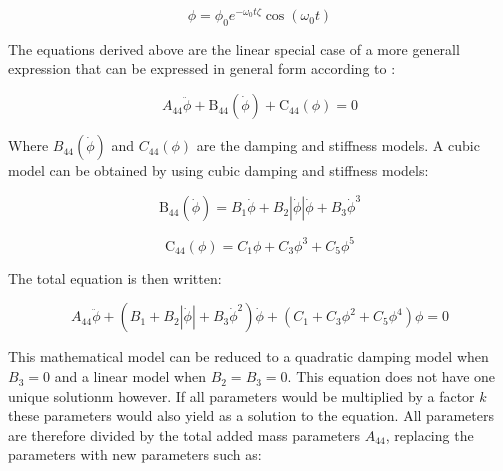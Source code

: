     \begin{equation}
\phi = \phi_{0} e^{- \omega_{0} t \zeta} \operatorname{cos}\left(\omega_{0} t\right)
\label{eq:equation}
\end{equation}

    

    The equations derived above are the linear special case of a more
generall expression that can be expressed in general form according to
\cite{7505983/FB64RGPF}:
 
            
    
    \begin{equation}
A_{44} \ddot{\phi} + \operatorname{B_{44}}\left(\dot{\phi}\right) + \operatorname{C_{44}}\left(\phi\right) = 0
\label{eq:equation}
\end{equation}

    

    Where \(B_{44}(\dot{\phi})\) and \(C_{44}(\phi)\) are the damping and
stiffness models. A cubic model can be obtained by using cubic damping
and stiffness models:
 
            
    
    \begin{equation}
\operatorname{B_{44}}\left(\dot{\phi}\right) = B_{1} \dot{\phi} + B_{2} \left|{\dot{\phi}}\right| \dot{\phi} + B_{3} \dot{\phi}^{3}
\label{eq:equation}
\end{equation}

    
 
            
    
    \begin{equation}
\operatorname{C_{44}}\left(\phi\right) = C_{1} \phi + C_{3} \phi^{3} + C_{5} \phi^{5}
\label{eq:equation}
\end{equation}

    

    The total equation is then written:
 
            
    
    \begin{equation}
A_{44} \ddot{\phi} + \left(B_{1} + B_{2} \left|{\dot{\phi}}\right| + B_{3} \dot{\phi}^{2}\right) \dot{\phi} + \left(C_{1} + C_{3} \phi^{2} + C_{5} \phi^{4}\right) \phi = 0
\label{eq:equation}
\end{equation}

    

    This mathematical model can be reduced to a quadratic damping model when
\(B_3=0\) and a linear model when \(B_2=B_3=0\). This equation does not
have one unique solutionm however. If all parameters would be multiplied
by a factor \(k\) these parameters would also yield as a solution to the
equation. All parameters are therefore divided by the total added mass
parameters \(A_{44}\), replacing the parameters with new parameters such
as:
 
